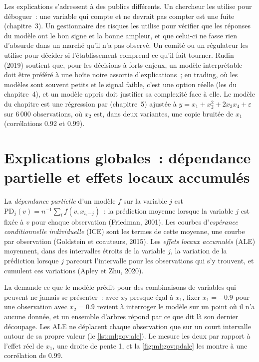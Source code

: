Les explications s'adressent à des publics différents. Un chercheur les utilise pour déboguer~: une variable qui compte et ne devrait pas compter est une fuite
(chapitre~3). Un gestionnaire des risques les utilise pour vérifier que les réponses du modèle ont le bon signe et la bonne ampleur, et que celui-ci ne
fasse rien d'absurde dans un marché qu'il n'a pas observé. Un comité ou un régulateur les utilise pour décider si l'établissement comprend
ce qu'il fait tourner. Rudin (2019) soutient que, pour les décisions à forts enjeux, un modèle interprétable doit être préféré à une boîte noire
assortie d'explications~; en trading, où les modèles sont souvent petits et le signal faible, c'est une option réelle (les  du chapitre~4),
et un modèle appris doit justifier sa complexité face à elle. Le modèle du chapitre est une régression par  (chapitre~5)
ajustée à $y = x_1 + x_2^2 + 2x_3x_4 + \varepsilon$ sur 6\,000 observations, où $x_2$ est, dans deux variantes, une copie bruitée de
$x_1$ (corrélations 0.92 et 0.99).

\section{Explications globales~: dépendance partielle et effets locaux accumulés}

\begin{definition}\label{def:ml:interpretability-and-model-governance:pd}
La \emph{dépendance partielle} d'un modèle $f$ sur la variable $j$ est $\mathrm{PD}_j(v) = n^{-1}\sum_i
f(v, x_{i,-j})$~: la prédiction moyenne lorsque la variable $j$ est fixée à $v$ pour chaque observation (Friedman, 2001). Les courbes
d'\emph{espérance conditionnelle individuelle} (ICE) sont les termes de cette
moyenne, une courbe par observation (Goldstein et coauteurs, 2015).
Les \emph{effets locaux accumulés} (ALE) moyennent, dans des intervalles étroits de la variable $j$, la variation de la prédiction lorsque $j$ parcourt l'intervalle
pour les observations qui s'y trouvent, et cumulent ces variations (Apley et Zhu, 2020).
\end{definition}

La  demande ce que le modèle prédit pour des combinaisons de variables qui peuvent ne jamais se présenter~: avec $x_2$ presque égal
à $x_1$, fixer $x_1 = -0.9$ pour une observation avec $x_2 = 0.9$ revient à interroger le modèle sur un point où il n'a aucune donnée, et un
ensemble d'arbres répond par ce que dit là son dernier découpage. Les ALE ne déplacent chaque observation que sur un court intervalle autour
de sa propre valeur (le \cref{lst:ml:gov:ale}). Le  mesure les deux par rapport à l'effet réel de $x_1$, une droite
de pente 1, et la \cref{fig:ml:gov:pdale} les montre à une corrélation de 0.99.

